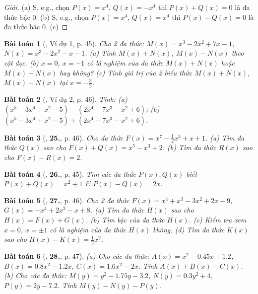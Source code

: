\documentclass{article}
\numberwithin{equation}{section}
\newtheorem{baitoan}{Bài toán}
\begin{document}
\begin{proof}[Giải]
	(a) S, e.g., chọn $P(x) = x^4$, $Q(x) = -x^4$ thì $P(x) + Q(x) = 0$ là đa thức bậc 0. (b) S, e.g., chọn $P(x) = x^4$, $Q(x) = x^4$ thì $P(x) - Q(x) = 0$ là đa thức bậc 0. (c)
\end{proof}

\begin{baitoan}[\cite{SBT_Toan_7_Canh_Dieu_tap_2}, Ví dụ 1, p. 45]
	Cho 2 đa thức: $M(x) =  x^3 - 2x^2 + 7x - 1$, $N(x) = x^3 - 2x^2 - x - 1$. (a) Tính $M(x) + N(x)$, $M(x) - N(x)$ theo cột dọc. (b) $x = 0$, $x = -1$ có là nghiệm của đa thức $M(x) + N(x)$ hoặc $M(x) - N(x)$ hay không? (c) Tính giá trị của 2 biểu thức $M(x) + N(x)$, $M(x) - N(x)$ tại $x = -\frac{3}{2}$.
\end{baitoan}

\begin{baitoan}[\cite{SBT_Toan_7_Canh_Dieu_tap_2}, Ví dụ 2, p. 46]
	Tính: (a) $(x^5 - 3x^4 + x^2 - 5) - (2x^4 + 7x^3 - x^2 + 6)$; (b) $(x^5 - 3x^4 + x^2 - 5) + (2x^4 + 7x^3 - x^2 + 6)$.
\end{baitoan}

\begin{baitoan}[\cite{SBT_Toan_7_Canh_Dieu_tap_2}, \textbf{25.}, p. 46]
	Cho đa thức $F(x) = x^7 - \frac{1}{2}x^3 + x + 1$. (a) Tìm đa thức $Q(x)$ sao cho $F(x) + Q(x) = x^5 - x^3 + 2$. (b) Tìm đa thức $R(x)$ sao cho $F(x) - R(x) = 2$.
\end{baitoan}

\begin{baitoan}[\cite{SBT_Toan_7_Canh_Dieu_tap_2}, \textbf{26.}, p. 45]
	Tìm các đa thức $P(x),Q(x)$ biết $P(x) + Q(x) = x^2 + 1$ \& $P(x) - Q(x) = 2x$.
\end{baitoan}

\begin{baitoan}[\cite{SBT_Toan_7_Canh_Dieu_tap_2}, \textbf{27.}, p. 46]
	Cho 2 đa thức $F(x) = x^4 + x^3 - 3x^2 + 2x - 9$, $G(x) = -x^4 + 2x^2 - x + 8$. (a) Tìm đa thức $H(x)$ sao cho $H(x) = F(x) + G(x)$. (b) Tìm bậc của đa thức $H(x)$. (c) Kiểm tra xem $x = 0$, $x = \pm1$ có là nghiệm của đa thức $H(x)$ không. (d) Tìm đa thức $K(x)$ sao cho $H(x) - K(x) = \frac{1}{2}x^2$.
\end{baitoan}

\begin{baitoan}[\cite{SBT_Toan_7_Canh_Dieu_tap_2}, \textbf{28.}, p. 47]
	(a) Cho các đa thức: $A(x) = x^2 - 0.45x + 1.2$, $B(x) = 0.8x^2 - 1.2x$, $C(x) = 1.6x^2 - 2x$. Tính $A(x) + B(x) - C(x)$. (b) Cho các đa thức: $M(y) = y^2 - 1.75y - 3.2$, $N(y) = 0.3y^2 + 4$, $P(y) = 2y - 7.2$. Tính $M(y) - N(y) - P(y)$.
\end{baitoan}
\end{document}
